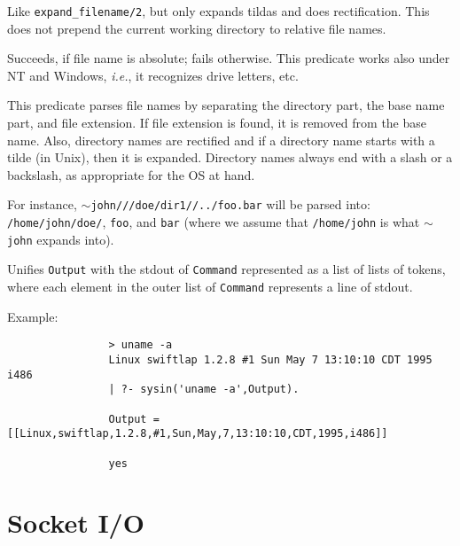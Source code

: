 \begin{description}
Like {\tt expand\_filename/2}, but only expands tildas and does
rectification. This does not prepend the current working directory to
relative file names.

  Succeeds, if file name is absolute; fails
otherwise.  This predicate works also under NT and Windows, {\it
i.e.}, it recognizes drive letters, etc.

This predicate parses file names by separating the directory part, the base
name part, and file extension. If file extension is found, it is removed
from the base name. Also, directory names are rectified and if a directory
name starts with a tilde (in Unix), then it is expanded. Directory names
always end with a slash or a backslash, as appropriate for the OS at hand.

For instance, {\tt $\sim$john///doe/dir1//../foo.bar} will be parsed into:
{\tt /home/john/doe/}, {\tt foo}, and {\tt bar} (where we assume that    
{\tt /home/john} is what {\tt $\sim$john} expands into).  



	Unifies {\tt Output} with the stdout of {\tt Command}
represented as a list of lists of tokens, where each element in the
outer list of {\tt Command} represents a line of stdout.

Example:
{\footnotesize
\begin{verbatim}
                > uname -a
                Linux swiftlap 1.2.8 #1 Sun May 7 13:10:10 CDT 1995 i486
                | ?- sysin('uname -a',Output).

                Output = [[Linux,swiftlap,1.2.8,#1,Sun,May,7,13:10:10,CDT,1995,i486]]

                yes
\end{verbatim}}

\end{description}



\section{Socket I/O}

